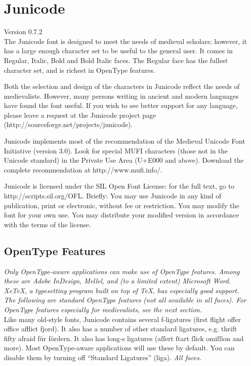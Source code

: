 \documentclass[a4paper]{article}
\begin{document}
\large
\section*{Junicode}

Version 0.7.2\\

\noindent The Junicode font is designed to
meet the needs of medieval scholars; however, it has a large enough
character set to be useful to the general user. It comes in Regular,
Italic, Bold and Bold Italic faces. The Regular face has the fullest
character set, and is richest in OpenType features.

Both the selection and design of the characters in Junicode reflect
the needs of medievalists.  However, many persons writing in ancient
and modern languages have found the font useful. If you wish to see
better support for any language, please leave a request at the
Junicode project page (http://sourceforge.net/projects/junicode).

Junicode implements most of the recommendation of the Medieval Unicode
Font Initiative (version 3.0).  Look for special MUFI characters
(those not in the Unicode standard) in the Private Use Area (U+E000
and above). Download the complete recommendation at
http://www.mufi.info/.

Junicode is licensed under the SIL Open Font License: for the full
text, go to
http://scripts.sil.org/OFL. Briefly: You may use Junicode in any
kind of publication, print or electronic, without fee or
restriction. You may modify the font for your own use. You may
distribute your modified version in accordance with the terms of the
license.

\pagebreak
\subsection*{OpenType Features}

{\itshape Only OpenType-aware applications can make use of OpenType
  features.  Among these are Adobe InDesign, Mellel, and (to a limited
  extent) Microsoft Word. XeTeX, a typesetting program built on top of
  TeX, has especially good support. The following are standard
  OpenType features (not all available in all faces). For OpenType
  features especially for medievalists, see the next section.}\\

\noindent Like many old-style fonts, Junicode contains several f-ligatures
(first flight offer office afflict fjord). It also has a number of
other standard ligatures, e.g. thrift fifty afraid für fördern.  It
also has long-s ligatures (aſſert ſtart ſlick omiſſion and more). Most
OpenType-aware applications will use these by default. You can disable
them by turning off “Standard Ligatures” (liga). {\itshape All
  faces.}\\
\end{document}
